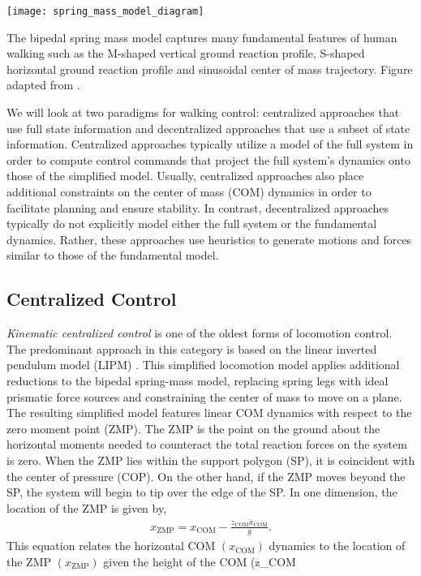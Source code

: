 \begin{marginfigure}
    \centering
    \texttt{[image: spring\_mass\_model\_diagram]}
    \caption{The bipedal spring mass model captures many fundamental features of
    human walking such as the M-shaped vertical ground reaction profile,
    S-shaped horizontal ground reaction profile and sinusoidal center of mass
    trajectory. Figure adapted from \citet{geyer2006compliant}.}
    \label{fig:ssm_diagram}
\end{marginfigure}

We will look at two paradigms for walking control: centralized approaches that
use full state information and decentralized approaches that use a subset of
state information. Centralized approaches typically utilize a model of the full
system in order to compute control commands that project the full system's
dynamics onto those of the simplified model. Usually, centralized approaches
also place additional constraints on the center of mass (COM) dynamics in order
to facilitate planning and ensure stability. In contrast, decentralized
approaches typically do not explicitly model either the full system or the
fundamental dynamics.  Rather, these approaches use heuristics to generate
motions and forces similar to those of the fundamental model.

\subsection{Centralized Control}\label{sec:back_centralized_control}

\emph{Kinematic centralized control} is one of the oldest forms of locomotion
control. The predominant approach in this category is based on the linear
inverted pendulum model (LIPM) \citep{kajita1991study, kajita20013d}.  This
simplified locomotion model applies additional reductions to the bipedal
spring-mass model, replacing spring legs with ideal prismatic force sources and
constraining the center of mass to move on a plane. The resulting simplified
model features linear COM dynamics with respect to the zero moment point (ZMP).
The ZMP is the point on the ground about the horizontal moments needed to
counteract the total reaction forces on the system is zero. When the ZMP lies
within the support polygon (SP), it is coincident with the center of pressure (COP). On the other
hand, if the ZMP moves beyond the SP, the system will begin to tip over the edge
of the SP. In one dimension, the location of the ZMP is given by, 
\begin{align} 
    x_\textrm{ZMP} = x_\textrm{COM} - \frac{z_\textrm{COM}
        \ddot{x}_\textrm{COM}}{g}. 
    \label{eq:ZMP}
\end{align}
This equation relates the horizontal COM $(x_\textrm{COM})$ dynamics to the
location of the ZMP $(x_\textrm{ZMP})$ given the height of the COM (z_\textrm{COM}

